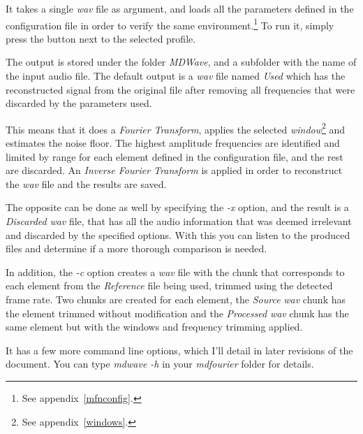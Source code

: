 \documentclass[10pt,a4paper]{report}
\newcommand{\ac}[1]{\textit{\mbox{\acrshort{#1}}}}
\begin{document}
\begin{appendices}
It takes a single \ac{wav} file as argument, and loads all the parameters defined in the configuration file in order to verify the same environment.\footnote{See appendix~\ref{mfnconfig}.} To run it, simply press the button next to the selected profile.

The output is stored under the folder \textit{MDWave}, and a subfolder with the name of the input audio file. The default output is a \ac{wav} file named \textit{Used} which has the reconstructed signal from the original file after removing all frequencies that were discarded by the parameters used.

This means that it does a \textit{Fourier Transform}, applies the selected \textit{window}\footnote{See appendix~\ref{windows}.} and estimates the noise floor. The highest amplitude frequencies are identified and limited by range for each element defined in the configuration file, and the rest are discarded. An \textit{Inverse Fourier Transform} is applied in order to reconstruct the \ac{wav} file and the results are saved.

The opposite can be done as well by specifying the \textit{-x} option, and the result is a \textit{Discarded} \ac{wav} file, that has all the audio information that was deemed irrelevant and discarded by the specified options. With this you can listen to the produced files and determine if a more thorough comparison is needed.

In addition, the \textit{-c} option creates a \ac{wav} file with the chunk that corresponds to each element from the \textit{Reference} file being used, trimmed using the detected frame rate. Two chunks are created for each element, the \textit{Source} \ac{wav} chunk has the element trimmed without modification and the \textit{Processed} \ac{wav} chunk has the same element but with the windows and frequency trimming applied.

It has a few more command line options, which I'll detail in later revisions of the document. You can type \textit{mdwave -h} in your \textit{mdfourier} folder for details.


\end{appendices}
\end{document}
